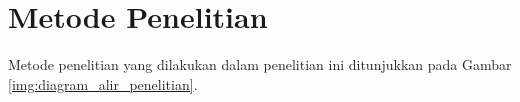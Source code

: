 \fancyhf{} 
\fancyfoot[R]{\thepage}

\begin{figure}[H]
\end{figure}

\fancyhf{} 
\fancyfoot[R]{\thepage}

\section{Metode Penelitian}
Metode penelitian yang dilakukan dalam penelitian ini ditunjukkan pada Gambar \ref{img:diagram_alir_penelitian}.

